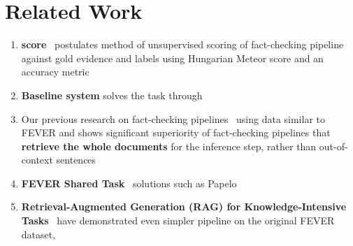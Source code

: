 \section{Related Work}
\label{sec:relwork}
\begin{enumerate}
    \item \textbf{\averitec{} score}~\cite{averitec2024} postulates method of unsupervised scoring of fact-checking pipeline against gold evidence and labels using Hungarian Meteor score and an accuracy metric
    \item \textbf{Baseline \averitec{} system} solves the task through 
    \item Our previous research on fact-checking pipelines~\cite{Ullrich2023,drchal2023pipelinedatasetgenerationautomated} using data similar to FEVER and \averitec{} shows significant superiority of fact-checking pipelines that \textbf{retrieve the whole documents} for the inference step, rather than out-of-context sentences
    \item \textbf{FEVER Shared Task}~\cite{thorne-etal-2018-fact} solutions such as Papelo~\cite{}
    \item \textbf{Retrieval-Augmented Generation (RAG) for Knowledge-Intensive Tasks}~\cite{rag} have demonstrated even simpler pipeline on the original FEVER dataset, 
\end{enumerate}

